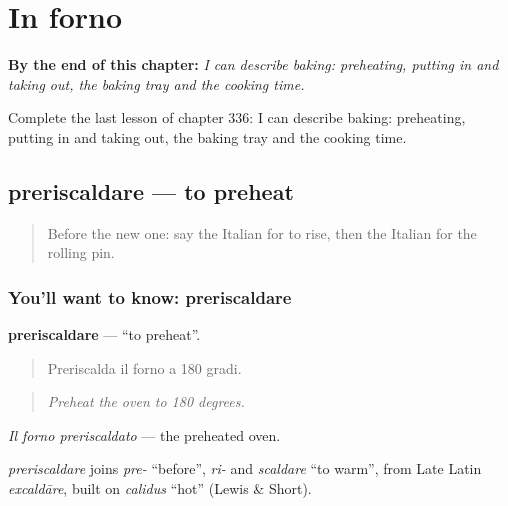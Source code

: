 
\chapter{In forno}
\label{ch:it-in-forno}

\begin{chapteropening}
\textbf{By the end of this chapter:} \emph{I can describe baking: preheating, putting in and taking out, the baking tray and the cooking time.}

Complete the last lesson of chapter 336: I can describe baking: preheating, putting in and taking out, the baking tray and the cooking time.
\end{chapteropening}

\section[preriscaldare]{preriscaldare — to preheat}

\label{lesson:IT-C336-preriscaldare}



\begin{quote}
Before the new one: say the Italian for to rise, then the Italian for the rolling pin.
\end{quote}

\subsection*{You'll want to know: preriscaldare}
\textbf{preriscaldare} — \textquotedblleft{}to preheat\textquotedblright{}.

\begin{quote}
Preriscalda il forno a 180 gradi.
\end{quote}

\begin{quote}
\emph{Preheat the oven to 180 degrees.}
\end{quote}

\emph{Il forno preriscaldato} — the preheated oven.

\begin{cousinweb}
\emph{preriscaldare} joins \emph{pre-} \textquotedblleft{}before\textquotedblright{}, \emph{ri-} and \emph{scaldare} \textquotedblleft{}to warm\textquotedblright{}, from Late Latin \emph{excaldāre}, built on \emph{calidus} \textquotedblleft{}hot\textquotedblright{} (Lewis \& Short).
\end{cousinweb}

